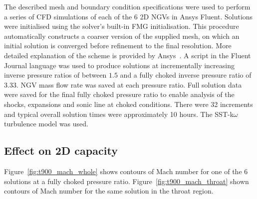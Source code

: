 \documentclass[a4paper, 11pt, oneside]{report}
\begin{document}
The described mesh and boundary condition specifications were used to perform a series of CFD simulations of each of the 6 2D NGVs in Ansys Fluent. Solutions were initialised using the solver's built-in FMG initialisation. This procedure automatically constructs a coarser version of the supplied mesh, on which an initial solution is converged before refinement to the final resolution. More detailed explanation of the scheme is provided by Ansys~\cite{ansys_fmg_initialisation}. A script in the Fluent Journal language was used to produce solutions at incrementally increasing inverse pressure ratios of between $1.5$ and a fully choked inverse pressure ratio of $3.33$. NGV mass flow rate was saved at each pressure ratio. Full solution data were saved for the final fully choked pressure ratio to enable analysis of the shocks, expansions and sonic line at choked conditions. There were 32 increments and typical overall solution times were approximately 10 hours. The SST-k$\omega$ turbulence model was used.

\subsection{Effect on 2D capacity}

Figure~\ref{fig:t900_mach_whole} shows contours of Mach number for one of the 6 solutions at a fully choked pressure ratio. Figure~\ref{fig:t900_mach_throat} shown contours of Mach number for the same solution in the throat region.
\end{document}
